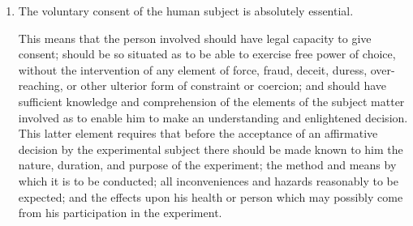 \documentclass[12pt] {article}
\begin{document}
\begin{enumerate}
\def\labelenumi{\arabic{enumi}.}
\item
  The voluntary consent of the human subject is absolutely essential.

  This means that the person involved should have legal capacity to give
  consent; should be so situated as to be able to exercise free power of
  choice, without the intervention of any element of force, fraud,
  deceit, duress, over-reaching, or other ulterior form of constraint or
  coercion; and should have sufficient knowledge and comprehension of
  the elements of the subject matter involved as to enable him to make
  an understanding and enlightened decision. This latter element
  requires that before the acceptance of an affirmative decision by the
  experimental subject there should be made known to him the nature,
  duration, and purpose of the experiment; the method and means by which
  it is to be conducted; all inconveniences and hazards reasonably to be
  expected; and the effects upon his health or person which may possibly
  come from his participation in the experiment.


\end{enumerate}
\end{document}
